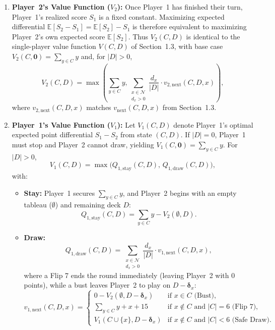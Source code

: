 \documentclass{article}
\theoremstyle{plain}
\theoremstyle{definition}
\theoremstyle{remark}
\begin{document}
\begin{enumerate}
    \item \textbf{Player~2's Value Function ($V_2$):} Once Player~1 has finished their turn, Player~1's realized score $S_1$ is a fixed constant. Maximizing expected differential $\mathbb{E}[S_2 - S_1] = \mathbb{E}[S_2] - S_1$ is therefore equivalent to maximizing Player~2's own expected score $\mathbb{E}[S_2]$. Thus $V_2(C, D)$ is identical to the single-player value function $V(C, D)$ of Section~1.3, with base case $V_2(C, \mathbf{0}) = \sum_{y \in C} y$ and, for $|D| > 0$,
    \[
        V_2(C, D) = \max \left( \sum_{y \in C} y, \sum_{\substack{x \in \mathcal{N} \\ d_x > 0}} \frac{d_x}{|D|} \cdot v_{2,\text{next}}(C, D, x) \right),
    \]
    where $v_{2,\text{next}}(C, D, x)$ matches $v_{\text{next}}(C, D, x)$ from Section~1.3.

    \item \textbf{Player~1's Value Function ($V_1$):} Let $V_1(C, D)$ denote Player~1's optimal expected point differential $S_1 - S_2$ from state $(C, D)$. If $|D| = 0$, Player~1 must stop and Player~2 cannot draw, yielding $V_1(C, \mathbf{0}) = \sum_{y \in C} y$. For $|D| > 0$,
    \[
        V_1(C, D) = \max \Big( Q_{1,\text{stay}}(C, D), \, Q_{1,\text{draw}}(C, D) \Big),
    \]
    with:
    \begin{itemize}
        \item \textbf{Stay:} Player~1 secures $\sum_{y \in C} y$, and Player~2 begins with an empty tableau ($\emptyset$) and remaining deck $D$:
        \[
            Q_{1,\text{stay}}(C, D) = \sum_{y \in C} y - V_2(\emptyset, D).
        \]
        \item \textbf{Draw:}
        \[
            Q_{1,\text{draw}}(C, D) = \sum_{\substack{x \in \mathcal{N} \\ d_x > 0}} \frac{d_x}{|D|} \cdot v_{1,\text{next}}(C, D, x),
        \]
        where a Flip 7 ends the round immediately (leaving Player~2 with $0$ points), while a bust leaves Player~2 to play on $D - \boldsymbol{\delta}_x$:
        \[
            v_{1,\text{next}}(C, D, x) =
            \begin{cases}
                0 - V_2(\emptyset, D - \boldsymbol{\delta}_x) & \text{if } x \in C \text{ (Bust)}, \\
                \sum_{y \in C} y + x + 15 & \text{if } x \notin C \text{ and } |C| = 6 \text{ (Flip 7)}, \\
                V_1(C \cup \{x\}, D - \boldsymbol{\delta}_x) & \text{if } x \notin C \text{ and } |C| < 6 \text{ (Safe Draw)}.
            \end{cases}
        \]
    \end{itemize}
\end{enumerate}
\end{document}
